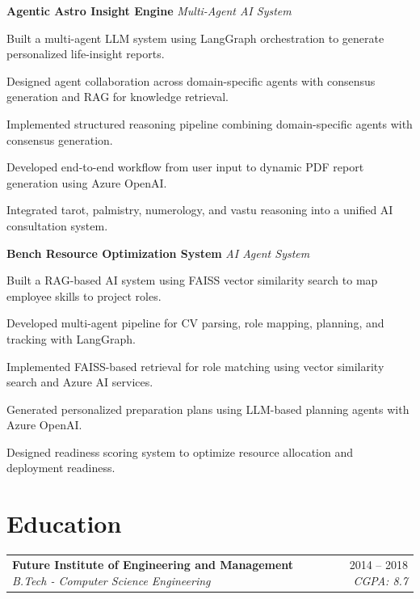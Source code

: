 \documentclass[10pt, letterpaper]{article}
\makeatletter
\newcommand{\resumeitem}[1]{\item\small{#1}}
\newcommand{\jobheading}[4]{%
  \noindent
  \begin{tabularx}{\textwidth}{@{}X r@{}}
    \textbf{\color{primary}#1} \textbar{} \textit{\small\color{subtle}#2} &
    \small\color{subtle}#3 \textbar{} \textit{\small #4}
  \end{tabularx}%
}
\makeatother
\begin{document}
\noindent\textbf{Agentic Astro Insight Engine} \textemdash{} \textit{Multi-Agent AI System}

\begin{projectitems}
\resumeitem{Built a multi-agent LLM system using LangGraph orchestration to generate personalized life-insight reports.}
\resumeitem{Designed agent collaboration across domain-specific agents with consensus generation and RAG for knowledge retrieval.}
\resumeitem{Implemented structured reasoning pipeline combining domain-specific agents with consensus generation.}
\resumeitem{Developed end-to-end workflow from user input to dynamic PDF report generation using Azure OpenAI.}
\resumeitem{Integrated tarot, palmistry, numerology, and vastu reasoning into a unified AI consultation system.}
\end{projectitems}

\noindent\textbf{Bench Resource Optimization System} \textemdash{} \textit{AI Agent System}

\begin{projectitems}
\resumeitem{Built a RAG-based AI system using FAISS vector similarity search to map employee skills to project roles.}
\resumeitem{Developed multi-agent pipeline for CV parsing, role mapping, planning, and tracking with LangGraph.}
\resumeitem{Implemented FAISS-based retrieval for role matching using vector similarity search and Azure AI services.}
\resumeitem{Generated personalized preparation plans using LLM-based planning agents with Azure OpenAI.}
\resumeitem{Designed readiness scoring system to optimize resource allocation and deployment readiness.}
\end{projectitems}

\section{Education}

\jobheading{Future Institute of Engineering and Management}{B.Tech - Computer Science Engineering}{2014 -- 2018}{CGPA: 8.7}
\end{document}
